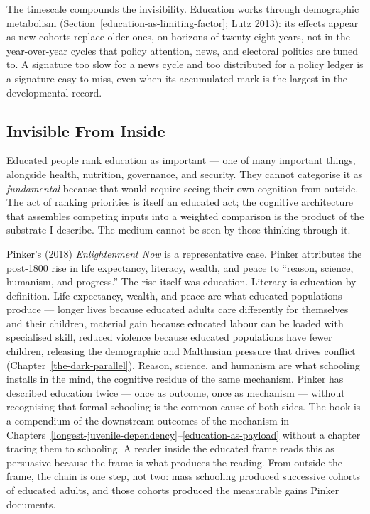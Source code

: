 \documentclass[12pt,letterpaper]{article}
\begin{document}
The timescale compounds the invisibility. Education works through
demographic metabolism (Section~\ref{education-as-limiting-factor};
Lutz 2013): its effects appear as new cohorts replace older ones,
on horizons of twenty-eight years, not in the year-over-year cycles
that policy attention, news, and electoral politics are tuned to.
A signature too slow for a news cycle and too distributed for a
policy ledger is a signature easy to miss, even when its
accumulated mark is the largest in the developmental record.

\subsection{Invisible From Inside}\label{invisible-from-inside}

Educated people rank education as important --- one of many important
things, alongside health, nutrition, governance, and security. They
cannot categorise it as \emph{fundamental} because that would require
seeing their own cognition from outside. The act of ranking priorities
is itself an educated act; the cognitive architecture that assembles
competing inputs into a weighted comparison is the product of the
substrate I describe. The medium cannot be seen by those
thinking through it.

Pinker's (2018) \emph{Enlightenment Now} is a representative case.
Pinker attributes the post-1800 rise in life expectancy, literacy,
wealth, and peace to ``reason, science, humanism, and progress.'' The
rise itself was education. Literacy is education by definition.
Life expectancy, wealth, and peace are what educated populations
produce --- longer lives because educated adults care differently for
themselves and their children, material gain because educated labour
can be loaded with specialised skill, reduced violence because educated
populations have fewer children, releasing the demographic and
Malthusian pressure that drives conflict (Chapter~\ref{the-dark-parallel}). Reason, science, and humanism
are what schooling installs in the mind, the cognitive residue
of the same mechanism. Pinker has described education twice --- once
as outcome, once as mechanism --- without recognising that formal
schooling is the common cause of both sides. The book is a compendium
of the downstream outcomes of the mechanism in
Chapters~\ref{longest-juvenile-dependency}--\ref{education-as-payload}
without a chapter tracing them to schooling. A reader inside the
educated frame reads this as persuasive because the frame is what
produces the reading. From outside the frame, the chain is one step,
not two: mass schooling produced successive cohorts of educated adults,
and those cohorts produced the measurable gains Pinker documents.
\end{document}
